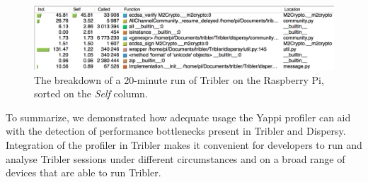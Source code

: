 \begin{figure}[!h]
	\centering
	\includegraphics[width=1.0\columnwidth]{images/experiments/yappi_breakdown_self}
	\caption{The breakdown of a 20-minute run of Tribler on the Raspberry Pi, sorted on the \emph{Self} column.}
	\label{fig:yappi_breakdown_self}
\end{figure}

To summarize, we demonstrated how adequate usage the Yappi profiler can aid with the detection of performance bottlenecks present in Tribler and Dispersy. Integration of the profiler in Tribler makes it convenient for developers to run and analyse Tribler sessions under different circumstances and on a broad range of devices that are able to run Tribler.

